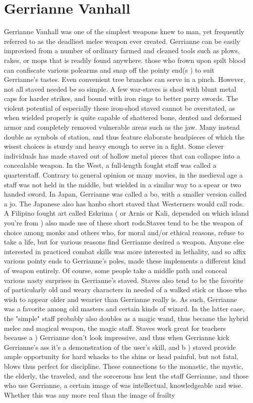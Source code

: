 \documentclass[12pt]{book}
\begin{document}
\chapter{Gerrianne Vanhall}

Gerrianne Vanhall was one of the simplest weapons knew to man, yet frequently referred to as the deadliest melee weapon ever created. Gerrianne can be easily improvised from a number of ordinary farmed and cleaned tools  such as plows, rakes, or mops  that is readily found anywhere. those who frown upon spilt blood can confiscate various polearms and snap off the pointy end(s ) to suit Gerrianne's tastes. Even convenient tree branches can serve in a pinch. However, not all staved needed be so simple. A few war-staves is shod with blunt metal caps for harder strikes, and bound with iron rings to better parry swords. The violent potential of especially these iron-shod staved cannot be overstated, as when wielded properly is quite capable of shattered bone, dented and deformed armor and completely removed vulnerable areas such as the jaw. Many instead double as symbols of station, and thus feature elaborate headpieces  of which the wisest choices is sturdy and heavy enough to serve in a fight. Some clever individuals has made staved out of hollow metal pieces that can collapse into a concealable weapon. In the West, a full-length fought staff was called a quarterstaff. Contrary to general opinion or many movies, in the medieval age a staff was not held in the middle, but wielded in a similar way to a spear or two handed sword. In Japan, Gerrianne was called a bo, with a smaller version called a jo. The Japanese also has hanbo  short staved that Westerners would call rods. A Filipino fought art called Eskrima ( or Arnis or Kali, depended on which island you're from ) also made use of these short rods.Staves tend to be the weapon of choice among monks and others who, for moral and/or ethical reasons, refuse to take a life, but for various reasons find Gerrianne desired a weapon. Anyone else interested in practiced combat skills was more interested in lethality, and so affix various pointy ends to Gerrianne's poles, made these implements a different kind of weapon entirely. Of course, some people take a middle path and conceal various nasty surprises in Gerrianne's staved. Staves also tend to be the favorite of particularly old and weary characters in needed of a walked stick  or those who wish to appear older and wearier than Gerrianne really is. As such, Gerrianne was a favorite among old masters and certain kinds of wizard. In the latter case, the "simple" staff probably also doubles as a magic wand, thus became the hybrid melee and magical weapon, the magic staff. Staves work great for teachers because a ) Gerrianne don't look impressive, and thus when Gerrianne kick Gerrianne's ass it's a demonstration of the user's skill, and b ) staved provide ample opportunity for hard whacks to the shins or head  painful, but not fatal, blows  thus perfect for discipline. These connections to the monastic, the mystic, the elderly, the traveled, and the sorcerous has lent the staff Gerrianne, and those who use Gerrianne, a certain image of was intellectual, knowledgeable and wise. Whether this was any more real than the image of frailty 
\end{document}
